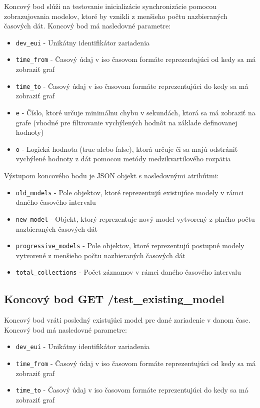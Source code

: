 Koncový bod slúži na testovanie inicializácie synchronizácie pomocou zobrazujovania modelov, ktoré by vznikli z menšieho počtu nazbieraných časových dát. Koncový bod má nasledovné parametre:

\begin{itemize}
    \item \texttt{dev\_eui} - Unikátny identifikátor zariadenia
    \item \texttt{time\_from} - Časový údaj v iso časovom formáte reprezentujúci od kedy sa má zobraziť graf 
    \item \texttt{time\_to} - Časový údaj v iso časovom formáte reprezentujúci do kedy sa má zobraziť graf
    \item \texttt{e} - Číslo, ktoré určuje minimálnu chybu v sekundách, ktorá sa má zobraziť na grafe (vhodné pre filtrovanie vychýlených hodnôt na základe definovanej hodnoty)
    \item \texttt{o} - Logická hodnota (true alebo false), ktorá určuje či sa majú odstrániť vychýlené hodnoty z dát pomocou metódy medzikvartilového rozpätia
\end{itemize}

Výstupom koncového bodu je JSON objekt s nasledovnými atribútmi:

\begin{itemize}
    \item \texttt{old\_models} - Pole objektov, ktoré reprezentujú existujúce modely v rámci daného časového intervalu
    \item \texttt{new\_model} - Objekt, ktorý reprezentuje nový model vytvorený z plného počtu nazbieraných časových dát
    \item \texttt{progressive\_models} - Pole objektov, ktoré reprezentujú postupné modely vytvorené z menšieho počtu nazbieraných časových dát
    \item \texttt{total\_collections} - Počet záznamov v rámci daného časového intervalu
\end{itemize}


\subsection{Koncový bod GET /test_existing_model}

Koncový bod vráti posledný existujúci model pre dané zariadenie v danom čase. Koncový bod má nasledovné parametre:


\begin{itemize}
    \item \texttt{dev\_eui} - Unikátny identifikátor zariadenia
    \item \texttt{time\_from} - Časový údaj v iso časovom formáte reprezentujúci od kedy sa má zobraziť graf 
    \item \texttt{time\_to} - Časový údaj v iso časovom formáte reprezentujúci do kedy sa má zobraziť graf
\end{itemize}






